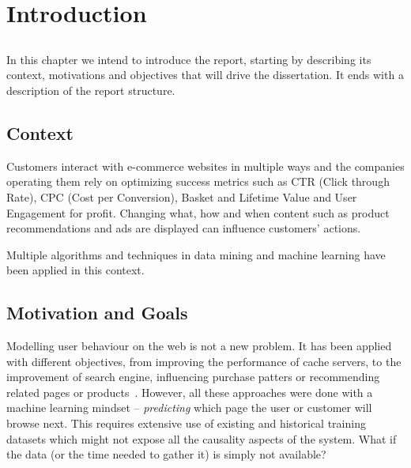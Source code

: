 \chapter{Introduction} \label{chap:intro}

\section*{}

In this chapter we intend to introduce the report, starting by describing its 
context, motivations and objectives that will drive the dissertation. It ends 
with a description of the report structure.


\section{Context} \label{sec:context}
 

Customers interact with e-commerce websites in multiple ways and the companies
operating them rely on optimizing success metrics such as CTR (Click
through Rate), CPC (Cost per Conversion), Basket and Lifetime Value and User
Engagement for profit. Changing what, how and when content such as product
recommendations and ads are displayed can influence customers' actions.

Multiple algorithms and techniques in data mining and machine learning
have been applied in this context.

\section{Motivation and Goals} \label{sec:goals}

Modelling user behaviour on the web is not a new problem. It has been applied 
with different objectives, from improving the performance of cache 
servers, to the improvement of search engine, influencing purchase patters or 
recommending related pages or products~\cite{Deshpande2001, 
JSrivastavaRCooley2000}. However, all these approaches were done with a machine 
learning mindset -- \textit{predicting} which page the user or customer will 
browse next. This requires extensive use of existing and historical training 
datasets which might not expose all the causality aspects of the system. What 
if the data (or the time needed to gather it) is simply not available?

